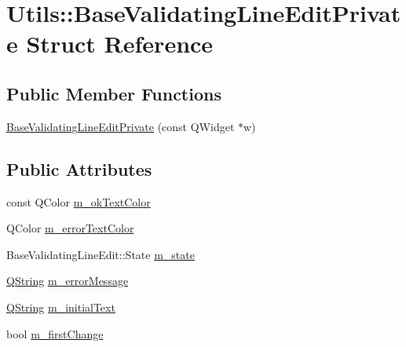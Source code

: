 \hypertarget{struct_utils_1_1_base_validating_line_edit_private}{\section{\-Utils\-:\-:\-Base\-Validating\-Line\-Edit\-Private \-Struct \-Reference}
\label{struct_utils_1_1_base_validating_line_edit_private}
}
\subsection*{\-Public \-Member \-Functions}
\begin{DoxyCompactItemize}
\item 
\hyperlink{struct_utils_1_1_base_validating_line_edit_private_a68effbe5d629bc89b20d768bcf6e336b}{\-Base\-Validating\-Line\-Edit\-Private} (const \-Q\-Widget $\ast$w)
\end{DoxyCompactItemize}
\subsection*{\-Public \-Attributes}
\begin{DoxyCompactItemize}
\item 
const \-Q\-Color \hyperlink{struct_utils_1_1_base_validating_line_edit_private_a93a0919e984d20572667722990e1f3ec}{m\-\_\-ok\-Text\-Color}
\item 
\-Q\-Color \hyperlink{struct_utils_1_1_base_validating_line_edit_private_aaa0cb150a25e8081973452da11520ca8}{m\-\_\-error\-Text\-Color}
\item 
\-Base\-Validating\-Line\-Edit\-::\-State \hyperlink{struct_utils_1_1_base_validating_line_edit_private_a5f2abc5b382f1099afcd254f43460031}{m\-\_\-state}
\item 
\hyperlink{group___u_a_v_objects_plugin_gab9d252f49c333c94a72f97ce3105a32d}{\-Q\-String} \hyperlink{struct_utils_1_1_base_validating_line_edit_private_a33100a5d6d547b5de11a0c27dc28201c}{m\-\_\-error\-Message}
\item 
\hyperlink{group___u_a_v_objects_plugin_gab9d252f49c333c94a72f97ce3105a32d}{\-Q\-String} \hyperlink{struct_utils_1_1_base_validating_line_edit_private_a8e2897fda859a5d9d1d8d5c02fd72c85}{m\-\_\-initial\-Text}
\item 
bool \hyperlink{struct_utils_1_1_base_validating_line_edit_private_aa380be78e3a48cb452f02706411f99f9}{m\-\_\-first\-Change}
\end{DoxyCompactItemize}


